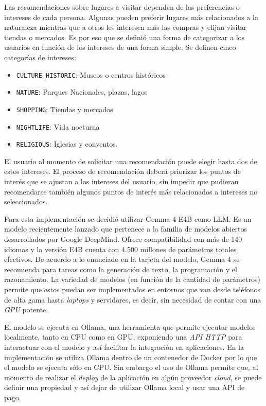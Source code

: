 Las recomendaciones sobre lugares a visitar dependen de las preferencias o intereses de cada persona.
Algunas pueden preferir lugares más relacionados a la naturaleza mientras que a otros les interesen más las compras y
elijan visitar tiendas o mercados.
Es por eso que se definió una forma de categorizar a los usuarios en función de los intereses de una forma simple.
Se definen cinco categorías de intereses:

\begin{itemize}
    \item \texttt{CULTURE\_HISTORIC}: Museos o centros históricos
    \item \texttt{NATURE}: Parques Nacionales, plazas, lagos
    \item \texttt{SHOPPING}: Tiendas y mercados
    \item \texttt{NIGHTLIFE}: Vida nocturna
    \item \texttt{RELIGIOUS}: Iglesias y conventos.
\end{itemize}

El usuario al momento de solicitar una recomendación puede elegir hasta dos de estos intereses.
El proceso de recomendación deberá priorizar los puntos de interés que se ajustan a los intereses del usuario, sin
impedir que pudieran recomendarse también algunos puntos de interés más relacionados a intereses no seleccionados.

Para esta implementación se decidió utilizar Gemma 4 E4B como LLM\@.
Es un modelo recientemente lanzado que pertenece a la familia de modelos abiertos desarrollados por Google DeepMind.
Ofrece compatibilidad con más de 140 idiomas y la versión E4B cuenta con 4.500 millones de parámetros totales efectivos.
De acuerdo a lo enunciado en la tarjeta del modelo, Gemma 4 se recomienda para tareas como la generación de texto, la
programación y el razonamiento.
La variedad de modelos (en función de la cantidad de parámetros) permite que estos puedan ser implementados en entornos
que van desde teléfonos de alta gama hasta \textit{laptops} y servidores, es decir, sin necesidad de contar con una \textit{GPU}
potente.

El modelo se ejecuta en Ollama, una herramienta que permite ejecutar modelos localmente, tanto en CPU como en GPU,
exponiendo una \textit{API HTTP} para interactuar con el modelo y así facilitar la integración en aplicaciones.
En la implementación se utiliza Ollama dentro de un contenedor de Docker por lo que el modelo se ejecuta sólo en CPU\@.
Sin embargo el uso de Ollama permite que, al momento de realizar el \textit{deploy} de la aplicación en algún proveedor
\textit{cloud}, se puede definir una propiedad y así dejar de utilizar Ollama local y usar una API de pago.

